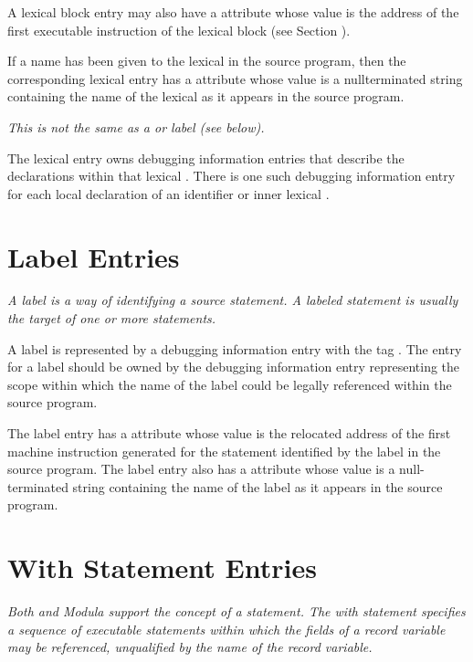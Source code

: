 A 
\hypertarget{chap:DWATentrypcoflexicalblock}{}
lexical block entry may also have 
a 
\DWATentrypc{} attribute
whose value is the address of the first executable instruction
of the lexical block (see 
Section ).

If a name has been given to the 
lexical  
in the source
program, then the corresponding 
lexical  entry has a
\DWATname{} attribute whose 
value is a null\dash terminated string
containing the name of the lexical  
as it appears in
the source program.

\textit{This is not the same as a  or 
 label (see below).}

The lexical  entry owns 
debugging information entries that
describe the declarations within that lexical . 
There is
one such debugging information entry for each local declaration
of an identifier or inner lexical .

\section{Label Entries}
\label{chap:labelentries}
\textit{A label is a way of identifying a source statement. A labeled
statement is usually the target of one or more 
statements.
}

A label is represented by a debugging information entry with
the 
tag \DWTAGlabelTARG. 
The entry for a label should be owned by
the debugging information entry representing the scope within
which the name of the label could be legally referenced within
the source program.

The label entry has a \DWATlowpc{} attribute whose value
is the relocated address of the first machine instruction
generated for the statement identified by the label in
the source program.  The label entry also has a 
\DWATname{} attribute 
whose value is a null-terminated string containing
the name of the label as it appears in the source program.


\section{With Statement Entries}
\label{chap:withstatemententries}

\textit{Both  and 
Modula support the concept of a 
statement. The with statement specifies a sequence of
executable statements within which the fields of a record
variable may be referenced, unqualified by the name of the
record variable.}

